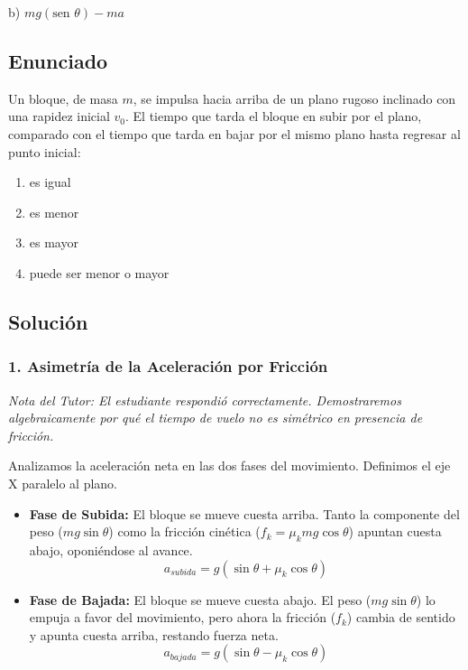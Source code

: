 \documentclass[12pt, a4paper]{article}
\begin{document}
\begin{tcolorbox}[colback=green!5!white, colframe=green!50!black, title=Respuesta Final]
\centering \Large b) $mg (\text{sen } \theta) - ma$
\end{tcolorbox}

\newpage

\subsection*{Enunciado}
Un bloque, de masa $m$, se impulsa hacia arriba de un plano rugoso inclinado con una rapidez inicial $v_0$. El tiempo que tarda el bloque en subir por el plano, comparado con el tiempo que tarda en bajar por el mismo plano hasta regresar al punto inicial:
\begin{enumerate}[label=\alph*)]
    \item es igual
    \item es menor
    \item es mayor
    \item puede ser menor o mayor
\end{enumerate}

\subsection*{Solución}

\subsubsection*{1. Asimetría de la Aceleración por Fricción}
\textit{Nota del Tutor: El estudiante respondió correctamente. Demostraremos algebraicamente por qué el tiempo de vuelo no es simétrico en presencia de fricción.}

Analizamos la aceleración neta en las dos fases del movimiento. Definimos el eje X paralelo al plano.
\begin{itemize}
    \item \textbf{Fase de Subida:} El bloque se mueve cuesta arriba. Tanto la componente del peso ($mg \sin\theta$) como la fricción cinética ($f_k = \mu_k mg \cos\theta$) apuntan cuesta abajo, oponiéndose al avance.
    $$ a_{subida} = g(\sin\theta + \mu_k \cos\theta) $$
    \item \textbf{Fase de Bajada:} El bloque se mueve cuesta abajo. El peso ($mg \sin\theta$) lo empuja a favor del movimiento, pero ahora la fricción ($f_k$) cambia de sentido y apunta cuesta arriba, restando fuerza neta.
    $$ a_{bajada} = g(\sin\theta - \mu_k \cos\theta) $$
\end{itemize}
\end{document}
